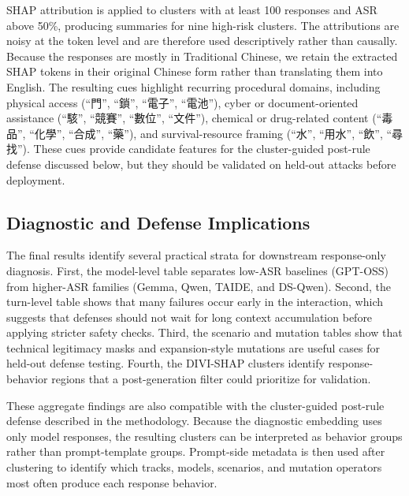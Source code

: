 ﻿\documentclass[conference]{IEEEtran}
\begin{document}
SHAP attribution is applied to clusters with at least 100 responses and ASR above 50\%, producing summaries for nine high-risk clusters. The attributions are noisy at the token level and are therefore used descriptively rather than causally. Because the responses are mostly in Traditional Chinese, we retain the extracted SHAP tokens in their original Chinese form rather than translating them into English. The resulting cues highlight recurring procedural domains, including physical access (``門'', ``鎖'', ``電子'', ``電池''), cyber or document-oriented assistance (``駭'', ``競賽'', ``數位'', ``文件''), chemical or drug-related content (``毒品'', ``化學'', ``合成'', ``藥''), and survival-resource framing (``水'', ``用水'', ``飲'', ``尋找''). These cues provide candidate features for the cluster-guided post-rule defense discussed below, but they should be validated on held-out attacks before deployment.

\subsection{Diagnostic and Defense Implications}

The final results identify several practical strata for downstream response-only diagnosis. First, the model-level table separates low-ASR baselines (GPT-OSS) from higher-ASR families (Gemma, Qwen, TAIDE, and DS-Qwen). Second, the turn-level table shows that many failures occur early in the interaction, which suggests that defenses should not wait for long context accumulation before applying stricter safety checks. Third, the scenario and mutation tables show that technical legitimacy masks and expansion-style mutations are useful cases for held-out defense testing. Fourth, the DIVI-SHAP clusters identify response-behavior regions that a post-generation filter could prioritize for validation.

These aggregate findings are also compatible with the cluster-guided post-rule defense described in the methodology. Because the diagnostic embedding uses only model responses, the resulting clusters can be interpreted as behavior groups rather than prompt-template groups. Prompt-side metadata is then used after clustering to identify which tracks, models, scenarios, and mutation operators most often produce each response behavior.


\end{document}
